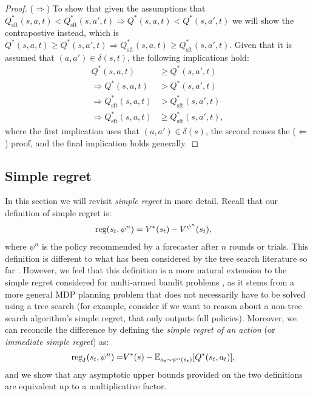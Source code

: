 \documentclass{article}
\newcommand{\bb}[1]{\mathbb{#1}}
\newcommand{\reg}{\textnormal{reg}}
\theoremstyle{plain}
\begin{document}
\begin{appendices}
\begin{proof}
            ($\Rightarrow$) To show that given the assumptions that $Q_{\text{sft}}^*(s,a,t)<Q_{\text{sft}}^*(s,a',t) \Rightarrow Q^*(s,a,t) < Q^*(s,a',t)$ we will show the contrapostive instead, which is $Q^*(s,a,t) \geq Q^*(s,a',t) \Rightarrow Q_{\text{sft}}^*(s,a,t)\geq Q_{\text{sft}}^*(s,a',t)$. Given that it is assumed that $(a,a')\in\delta(s,t)$, the following implications hold:
            \begin{align}
                Q^*(s,a,t) &\geq Q^*(s,a',t) \\
                \Rightarrow Q^*(s,a,t) &> Q^*(s,a',t) \\
                \Rightarrow Q_{\text{sft}}^*(s,a,t) &> Q_{\text{sft}}^*(s,a',t) \label{eq:reuse_proof} \\
                \Rightarrow Q_{\text{sft}}^*(s,a,t) &\geq Q_{\text{sft}}^*(s,a',t),
            \end{align}
            where the first implication uses that $(a,a')\in\delta(s)$, the second reuses the ($\Leftarrow$) proof, and the final implication holds generally. 
        \end{proof}
    
    
    
    
    
    


    
    
    
    
    \subsection{Simple regret} \label{app:simple_regret_results}
    
        In this section we will revisit \textit{simple regret} in more detail. Recall that our definition of simple regret is:
        \begin{align} 
            \reg(s_t,\psi^n) &= V^*(s_t) - V^{\psi^n}(s_t), 
        \end{align}
        where $\psi^n$ is the policy recommended by a forecaster after $n$ rounds or trials. This definition is different to what has been considered by the tree search literature so far . However, we feel that this definition is a more natural extension to the simple regret considered for multi-armed bandit problems , as it stems from a more general MDP planning problem that does not necessarily have to be solved using a tree search (for example, consider if we want to reason about a non-tree search algorithm's simple regret, that only outputs full policies). Moreover, we can reconcile the difference by defining the \textit{simple regret of an action} (or \textit{immediate simple regret}) as:
        \begin{align}
            \reg_I(s_t,\psi^n) =& V^*(s) - \bb{E}_{a_t\sim\psi^n(s_t)}[Q^*(s_t,a_t)],
        \end{align}
        and we show that any asymptotic upper bounds provided on the two definitions are equivalent up to a multiplicative factor. 








\end{appendices}
\end{document}

